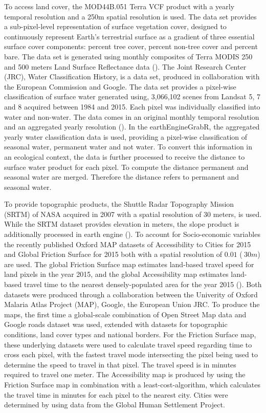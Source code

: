 To access land cover, the MOD44B.051 Terra VCF product with a yearly temporal resolution and a 250m spatial resolution is used. The data set provides a sub-pixel-level representation of surface vegetation cover, designed to continuously represent Earth's terrestrial surface as a gradient of three essential surface cover components: percent tree cover, percent non-tree cover and percent bare. The data set is generated using monthly composites of Terra MODIS 250 and 500 meters Land Surface Reflectance data (\cite{hansen2006vegetation}).
The Joint Research Center (JRC), Water Classification History, is a data set, produced in collaboration with the European Commission and Google. The data set provides a pixel-wise classification of surface water generated using, 3,066,102 scenes from Landsat 5, 7 and 8 acquired between 1984 and 2015. Each pixel was individually classified into water and non-water. The data comes in an original monthly temporal resolution and an aggregated yearly resolution (\cite{pekel2016high}). In the earthEngineGrabR, the aggregated yearly water classification data is used, providing a pixel-wise classification of seasonal water, permanent water and not water. To convert this information in an ecological context, the data is further processed to receive the distance to surface water product for each pixel. To compute the distance permanent and seasonal water are merged. Therefore the distance refers to permanent and seasonal water.

To provide topographic products, the Shuttle Radar Topography Mission (SRTM) of NASA acquired in 2007 with a spatial resolution of 30 meters, is used. While the SRTM dataset provides elevation in meters, the slope product is additionally processed in earth engine (\cite{farr2007shuttle}). To account for Socio-economic variables the recently published Oxford MAP datasets of Accessibility to Cities for 2015 and Global Friction Surface for 2015 both with a spatial resolution of $0.01$ ($~ 30m$) are used. The global Friction Surface map estimates land-based travel speed for land pixels in the year 2015, and the global Accessibility map estimates land-based travel time to the nearest densely-populated area for the year 2015 (\cite{weiss2018global}). Both datasets were produced through a collaboration between the Univerity of Oxford Malaria Atlas Project (MAP), Google, the European Union JRC. To produce the maps, the first time a global-scale combination of Open Street Map data and Google roads dataset was used, extended with datasets for topographic conditions, land cover types and national borders.
For the Friction Surface map, these underlying datasets were used to calculate travel speed regarding time to cross each pixel, with the fastest travel mode intersecting the pixel being used to determine the speed to travel in that pixel. The travel speed is in minutes required to travel one meter. The Accessibility map is produced by using the Friction Surface map in combination with a least-cost-algorithm, which calculates the travel time in minutes for each pixel to the nearest city. Cities were determined by using data from the Global Human Settlement Project.  

